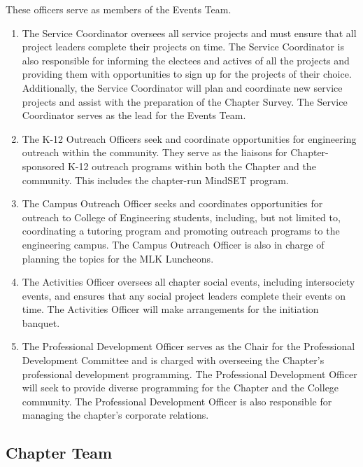 These officers serve as members of the Events Team.
\begin{enumerate}
    \item {}
    The Service Coordinator oversees all service projects and
must ensure that all project leaders complete their projects on time. The Service Coordinator
is also responsible for informing the electees and actives of all the projects
and providing them with opportunities to sign up for the projects of their choice. Additionally,
the Service Coordinator will plan and coordinate new service projects and
assist with the preparation of the Chapter Survey. The Service Coordinator serves as
the lead for the Events Team.
    \item {}
    The K-12 Outreach Officers seek and coordinate opportunities
for engineering outreach within the community. They serve as the liaisons for
Chapter-sponsored K-12 outreach programs within both the Chapter and the community.
This includes the chapter-run MindSET program.
    \item {}
    The Campus Outreach Officer seeks and coordinates
opportunities for outreach to College of Engineering students, including, but not limited
to, coordinating a tutoring program and promoting outreach programs to the
engineering campus. The Campus Outreach Officer is also in charge of planning the
topics for the MLK Luncheons.
    \item {}
    The Activities Officer oversees all chapter social events, including
intersociety events, and ensures that any social project leaders complete their
events on time. The Activities Officer will make arrangements for the initiation banquet.
    \item {}
    The Professional Development Officer serves
as the Chair for the Professional Development Committee and is charged with overseeing
the Chapter’s professional development programming. The Professional Development
Officer will seek to provide diverse programming for the Chapter and
the College community. The Professional Development Officer is also responsible for
managing the chapter’s corporate relations.
\end{enumerate}


\subsection{Chapter Team} \label{F.3}

